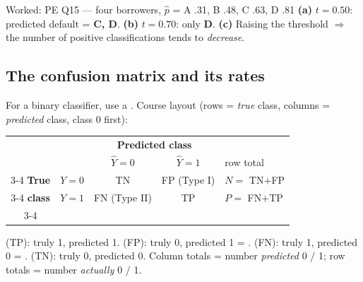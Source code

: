 \begin{qbox}{Worked: PE Q15 --- four borrowers, $\hat p$ = A .31, B .48, C .63, D .81}
\textbf{(a)} $t=0.50$: predicted default = \textbf{C, D}. \textbf{(b)} $t=0.70$: only \textbf{D}.
\textbf{(c)} Raising the threshold $\Rightarrow$ the number of positive classifications tends to \emph{decrease}. 
\end{qbox}

\subsection{The confusion matrix and its rates}
For a binary classifier, use a . Course layout 
(rows = \emph{true} class, columns = \emph{predicted} class, class 0 first):
\begin{center}\small
\begin{tabular}{@{}cc|c|c|l@{}}
\multicolumn{2}{c}{} & \multicolumn{2}{c}{\textbf{Predicted class}} & \\
\multicolumn{2}{c}{} & \multicolumn{1}{c}{$\hat Y=0$} & \multicolumn{1}{c}{$\hat Y=1$} & \scriptsize row total\\ \cline{3-4}
\textbf{True} & $Y=0$ & \cellcolor{keyc!15}TN & \cellcolor{warnc!15}FP {\scriptsize(Type I)} & $N=$ TN$+$FP\\ \cline{3-4}
\textbf{class} & $Y=1$ & \cellcolor{warnc!15}FN {\scriptsize(Type II)} & \cellcolor{keyc!15}TP & $P=$ FN$+$TP\\ \cline{3-4}
\end{tabular}
\end{center}
 (TP): truly 1, predicted 1.  (FP): truly 0, predicted 1 = .
 (FN): truly 1, predicted 0 = .  (TN): truly 0, predicted 0.
Column totals = number \emph{predicted} 0 / 1; row totals = number \emph{actually} 0 / 1.

